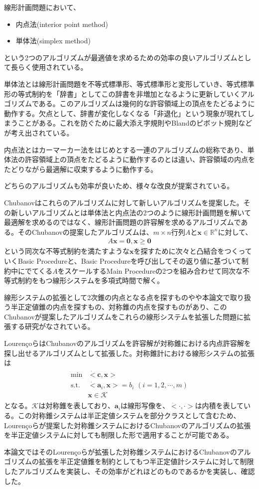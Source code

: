 線形計画問題において、
\begin{itemize}
  \item 内点法(interior point method)
  \item 単体法(simplex method)
\end{itemize}
という2つのアルゴリズムが最適値を求めるための効率の良いアルゴリズムとして長らく使用されている。

単体法とは線形計画問題を不等式標準形、等式標準形と変形していき、等式標準形の等式制約を「辞書」としてこの辞書を非増加となるように更新していくアルゴリズムである。このアルゴリズムは幾何的な許容領域上の頂点をたどるように動作する。欠点として、辞書が変化しなくなる「非退化」という現象が現れてしまうことがある。これを防ぐために最大添え字規則やBlandのピボット規則などが考え出されている\cite*{Optimization}。

内点法とはカーマーカー法をはじめとする一連のアルゴリズムの総称であり、単体法の許容領域上の頂点をたどるように動作するのとは違い、許容領域の内点をたどりながら最適解に収束するように動作する。

どちらのアルゴリズムも効率が良いため、様々な改良が提案されている\cite*{InteriorPointMethod}。

Chubanovはこれらのアルゴリズムに対して新しいアルゴリズムを提案した\cite*{Chubanov}。その新しいアルゴリズムとは単体法と内点法の2つのように線形計画問題を解いて最適解を求めるのではなく、線形計画問題の許容解を求めるアルゴリズムである。そのChubanovの提案したアルゴリズムは、$m \times n$行列$A$と$\mathbf{x} \in \mathbb{R}^n$に対して、
\begin{align*}
  A \mathbf{x} = \mathbf{0}, \mathbf{x} \geq \mathbf{0}
\end{align*}
という同次な不等式制約を満たすような$\mathbf{x}$を探すために次々と凸結合をつくっていくBasic Procedureと、Basic Procedureを呼び出してその返り値に基づいて制約中にでてくる$A$をスケールするMain Procedureの2つを組み合わせて同次な不等式制約をもつ線形システムを多項式時間で解く。

線形システムの拡張として2次錐の内点となる点を探すものやや本論文で取り扱う半正定値錐の内点を探すもの、対称錐の内点を探すものがあり、このChubanovが提案したアルゴリズムをこれらの線形システムを拡張した問題に拡張する研究がなされている\cite*{SOCP}\cite*{SymmetricCone}。

Louren\c{c}oらはChubanovのアルゴリズムを許容解が対称錐における内点許容解を探し出せるアルゴリズムとして拡張した\cite*{SymmetricCone}。対称錐計における線形システムの拡張は
\begin{align*}
  \begin{array}{ll}
    \text{min}  & \dot<\mathbf{c}, \mathbf{x}> \\
    \text{s.t.} & \dot<\mathbf{a}_i, \mathbf{x}> = b_i \,\, (i = 1, 2, \cdots, m) \\
                & \mathbf{x} \in \mathcal{K}
  \end{array}
\end{align*}
となる。$\mathcal{K}$は対称錐を表しており、$\mathbf{a}_i$は線形写像を、$\dot<\cdot, \cdot>$は内積を表している。この対称錐システムは半正定値システムを部分クラスとして含むため、Louren\c{c}oらが提案した対称錐システムにおけるChubanovのアルゴリズムの拡張を半正定値システムに対しても制限した形で適用することが可能である。

本論文ではそのLouren\c{c}oらが拡張した対称錐システムにおけるChubanovのアルゴリズムの拡張を半正定値錐を制約としてもつ半正定値計システムに対して制限したアルゴリズムを実装し、その効率がどれほどのものであるかを実装し、確認した。
